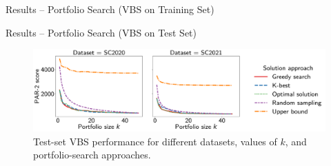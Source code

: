 \documentclass[en]{sdqbeamer}
\begin{document}
\begin{frame}[t]{Results -- Portfolio Search (VBS on Training Set)}
\begin{figure}[htb]
	\end{figure}
\end{frame}

\begin{frame}[t]{Results -- Portfolio Search (VBS on Test Set)}
	\begin{figure}[htb]
		\centering
		\includegraphics[width=\textwidth]{plots/search-test-objective.pdf}
		\caption*{Test-set VBS performance for different datasets, values of $k$, and portfolio-search approaches.}
	\end{figure}
\end{frame}
\end{document}
